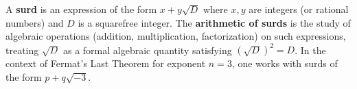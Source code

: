 A \textbf{surd} is an expression of the form $x + y\sqrt{D}$ where $x, y$ are integers (or rational numbers) and $D$ is a squarefree integer. The \textbf{arithmetic of surds} is the study of algebraic operations (addition, multiplication, factorization) on such expressions, treating $\sqrt{D}$ as a formal algebraic quantity satisfying $(\sqrt{D})^2 = D$. In the context of Fermat's Last Theorem for exponent $n = 3$, one works with surds of the form $p + q\sqrt{-3}$.
